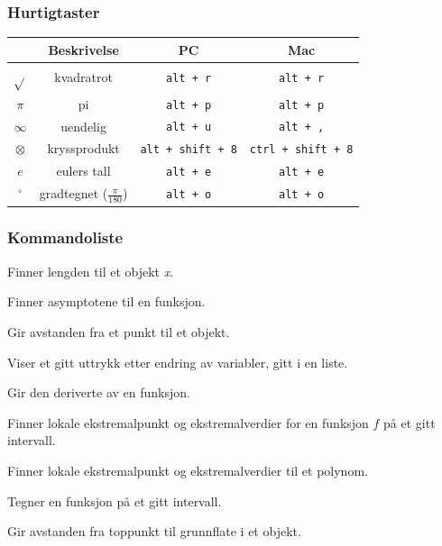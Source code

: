 \subsubsection{Hurtigtaster}
\begin{tabular}{@{}c | c |c | c }
	&\textbf{Beskrivelse} & \textbf{PC }& \textbf{Mac} \\ \hline
	$ \sqrt{} $	& kvadratrot& \texttt{alt\,+\,r} &\texttt{alt\,+\,r} \\\hline
	$ \pi $	& pi& \texttt{alt\,+\,p} & \texttt{alt\,+\,p}\\\hline
	$ \infty $ &uendelig& \texttt{alt\,+\,u} &\texttt{alt\,+\,,}  \\\hline
	$ \otimes $&kryssprodukt & \texttt{alt\,+\,shift\,+\,8}&\texttt{ctrl\,+\,shift\,+\,8} \\\hline
	$ e $&eulers tall & \texttt{alt\,+\,e}& \texttt{alt\,+\,e}\\\hline
	$ {}^\circ $&gradtegnet ($ \frac{\pi}{180} $) & \texttt{alt\,+\,o}& \texttt{alt\,+\,o}
	\\\hline	
\end{tabular}
\newpage
\subsubsection{Kommandoliste}
{Finner lengden til et objekt \textit{x}.
}

{Finner asymptotene til en funksjon.}

{Gir avstanden fra et punkt til et objekt.}

{Viser et gitt uttrykk etter endring av variabler, gitt i en liste.}

{Gir den deriverte av en funksjon.
	
	}

 {Finner lokale ekstremalpunkt og ekstremalverdier for en funksjon $ f $ på et gitt intervall.}

{Finner lokale ekstremalpunkt og ekstremalverdier til et polynom.}

{Tegner en funksjon på et gitt intervall.}

{Gir avstanden fra toppunkt til grunnflate i et objekt. 
	}

